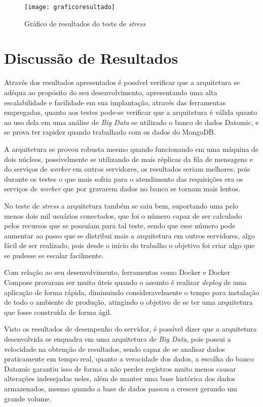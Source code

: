 \begin{figure}[!h]
\caption{\label{fig:graficoresultado} Gráfico de resultados do teste de \textit{stress}}
\begin{center}
\texttt{[image: graficoresultado]}
\end{center}
\end{figure}


\section{Discussão de Resultados}
\label{sec:discussãoresultados}
Através dos resultados apresentados é possível verificar que a arquitetura se adéqua ao propósito do seu desenvolvimento, apresentando uma alta escalabilidade e facilidade em sua implantação, através das ferramentas empregadas, quanto aos testes pode-se verificar que a arquitetura é válida quanto ao uso dela em uma análise de \textit{Big Data} se utilizado o banco de dados Datomic, e se prova ter rapidez quando trabalhado com os dados do MongoDB. 

A arquitetura se provou robusta mesmo quando funcionando em uma máquina de dois núcleos, possivelmente se utilizando de mais réplicas da fila de mensagens e do serviços de \textit{worker} em outros servidores,  os resultados seriam melhores, pois durante os testes o que mais sofria para o atendimento das requisições era os serviços de \textit{worker} que por gravarem dados no banco se tornam mais lentos.

No teste de \textit{stress} a arquitetura também se saiu bem, suportando uma pelo menos dois mil usuários conectados, que foi o número capaz de ser calculado pelos recursos que se possuíam para tal teste, sendo que esse número pode aumentar ao passo que se distribui mais a arquitetura em outros servidores, algo fácil de ser realizado, pois desde o início do trabalho o objetivo foi criar algo que se pudesse se escalar  facilmente.

Com relação ao seu desenvolvimento, ferramentas como Docker e Docker Compose provaram ser muito úteis quando o assunto é realizar \textit{deploy} de uma aplicação de forma rápida, diminuindo consideravelmente o tempo para instalação de todo o ambiente de produção, atingindo o objetivo de se ter uma arquitetura que fosse construída de forma ágil.

Visto os resultados de desempenho do servidor, é possível dizer que a arquitetura desenvolvida se enquadra em uma arquitetura de \textit{Big Data}, pois possui a velocidade na obtenção de resultados, sendo capaz de se analisar dados praticamente em tempo real, quanto a veracidade dos dados, a escolha do banco Datomic garantiu isso de forma a não perder registros muito menos causar alterações indesejadas neles, além de manter uma base histórica dos dados armazenados, mesmo quando a base de dados passou a crescer gerando um grande volume. 

